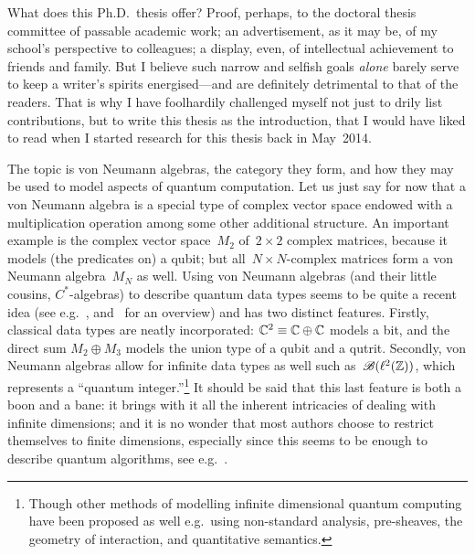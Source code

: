 \documentclass[b5paper]{book}
\begin{document}
\begin{parsec}{10}
\begin{point}{10}
What does this Ph.D.~thesis offer?
Proof, perhaps,
to the doctoral thesis committee
of passable academic work;
an advertisement, as it may be,
of my school's perspective
to colleagues;
a display, even,
of intellectual achievement
to friends and family.
But I believe such narrow and selfish goals \emph{alone}
barely serve to keep a writer's spirits 
energised---and are definitely detrimental to that of the readers.
That is why I have foolhardily
challenged
myself
not just 
to drily list contributions,
but to write this thesis 
as the introduction,
that I would have liked to read
when I started
research for this thesis
back in May~2014.

The topic is von Neumann algebras,
the category they form,
and how they may be used
to model aspects of quantum computation.
Let us just say for now that a von Neumann algebra
is a special type of complex vector
space endowed with
a multiplication operation among some other additional structure.
An important example is the complex vector space~$M_2$
of~$2\times 2$ complex matrices,
because it models (the predicates on) a qubit;
but all~$N\times N$-complex matrices form a von Neumann algebra~$M_N$ as well.
Using von Neumann algebras
(and their little cousins, $C^*$-algebras) 
to describe quantum data types 
seems to be quite a recent idea
(see e.g.~\cite{jacobs2013block,rennela2015operator,furber2013kleisli}, 
	and~\cite{cho2016semantics} for an overview)
and has two distinct features.
Firstly, classical data types
are neatly incorporated:
$\mathbb{C}^2 \equiv \mathbb{C}\oplus \mathbb{C}$
models a bit,
and the direct sum $M_2\oplus M_3$
models the union type of a qubit and a qutrit.
Secondly,
von Neumann algebras
allow for infinite data types as well
	such as~$\mathscr{B}(\ell^2(\mathbb{Z}))$,
which represents a ``quantum integer.''\footnote{Though
	other methods of modelling infinite dimensional
	quantum computing have been proposed as well
	e.g.~using non-standard analysis\cite{Gogioso2017},
	pre-sheaves\cite{malherbe2013categorical},
	the geometry of interaction\cite{hasuo2017semantics},
	and quantitative semantics\cite{pagani2014applying}.}
It should be said that this last feature
is both a boon and a bane:
it brings with it all the inherent
intricacies of dealing with infinite dimensions;
and it is no wonder that
most authors choose 
to restrict themselves
to finite dimensions,
especially since
this seems to be enough to describe quantum algorithms,
see e.g.~\cite{nielsen2002quantum}.
\end{point}

\end{parsec}
\end{document}
